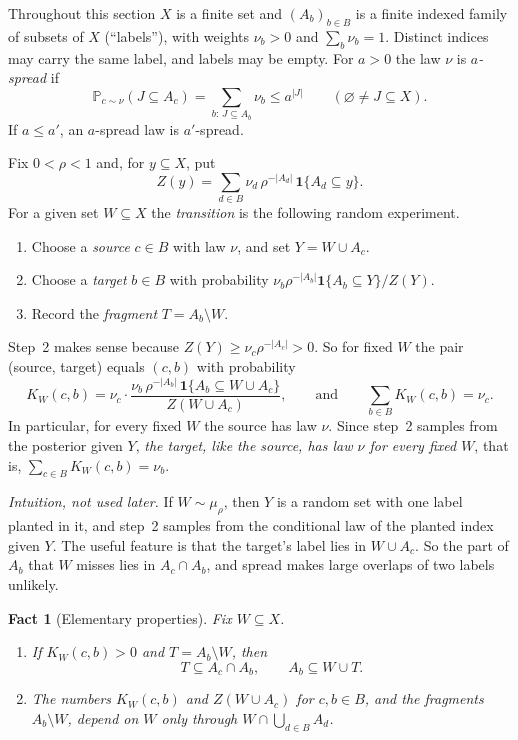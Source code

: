 \documentclass[11pt]{article}
\newtheorem{fact}{Fact}
\numberwithin{equation}{section}
\newcommand{\PP}{\mathbb P}
\newcommand{\ind}{\mathbf 1}
\begin{document}
Throughout this section $X$ is a finite set and $(A_b)_{b\in B}$ is a
finite indexed family of subsets of $X$ (``labels''), with weights
$\nu_b>0$ and $\sum_{b}\nu_b=1$. Distinct indices may carry the same
label, and labels may be empty. For $a>0$ the law $\nu$ is
\emph{$a$-spread} if
\begin{equation}\label{eq:spread}
 \PP_{c\sim\nu}(J\subseteq A_c)=\sum_{b:\,J\subseteq A_b}\nu_b\le a^{|J|}
 \qquad(\varnothing\ne J\subseteq X).
\end{equation}
If $a\le a'$, an $a$-spread law is $a'$-spread.

Fix $0<\rho<1$ and, for $y\subseteq X$, put
\begin{equation}\label{eq:Z}
 Z(y)=\sum_{d\in B}\nu_d\,\rho^{-|A_d|}\,\ind\{A_d\subseteq y\}.
\end{equation}
For a given set $W\subseteq X$ the \emph{transition} is the following
random experiment.
\begin{enumerate}[label=\arabic*.,leftmargin=2em,itemsep=2pt]
 \item Choose a \emph{source} $c\in B$ with law $\nu$, and set
 $Y=W\cup A_c$.
 \item Choose a \emph{target} $b\in B$ with probability
 $\nu_b\rho^{-|A_b|}\ind\{A_b\subseteq Y\}/Z(Y)$.
 \item Record the \emph{fragment} $T=A_b\setminus W$.
\end{enumerate}
Step~2 makes sense because $Z(Y)\ge\nu_c\rho^{-|A_c|}>0$. So for fixed
$W$ the pair (source, target) equals $(c,b)$ with probability
\begin{equation}\label{eq:kernel}
 K_W(c,b)=\nu_c\cdot
 \frac{\nu_b\,\rho^{-|A_b|}\,\ind\{A_b\subseteq W\cup A_c\}}{Z(W\cup A_c)},
 \qquad\text{and}\qquad \sum_{b\in B}K_W(c,b)=\nu_c .
\end{equation}
In particular, for every fixed $W$ the source has law $\nu$. Since
step~2 samples from the posterior given $Y$, \emph{the target, like the
source, has law $\nu$ for every fixed $W$}, that is,
$\sum_{c\in B}K_W(c,b)=\nu_b$.

\emph{Intuition, not used later.} If $W\sim\mu_\rho$, then $Y$ is a
random set with one label planted in it, and step~2 samples from the
conditional law of the planted index given $Y$. The useful feature is
that the target's label lies in $W\cup A_c$. So the part of $A_b$ that
$W$ misses lies in $A_c\cap A_b$, and spread makes large overlaps of
two labels unlikely.

\begin{fact}[Elementary properties]\label{fact:A}
Fix $W\subseteq X$.
\begin{enumerate}[label=(\alph*),leftmargin=2.2em,itemsep=2pt]
 \item If $K_W(c,b)>0$ and $T=A_b\setminus W$, then
 \begin{equation}\label{eq:two-inclusions}
  T\subseteq A_c\cap A_b,\qquad A_b\subseteq W\cup T .
 \end{equation}
 \item The numbers $K_W(c,b)$ and $Z(W\cup A_c)$ for $c,b\in B$, and
 the fragments $A_b\setminus W$, depend on $W$ only through
 $W\cap\bigcup_{d\in B}A_d$.
\end{enumerate}
\end{fact}
\end{document}
